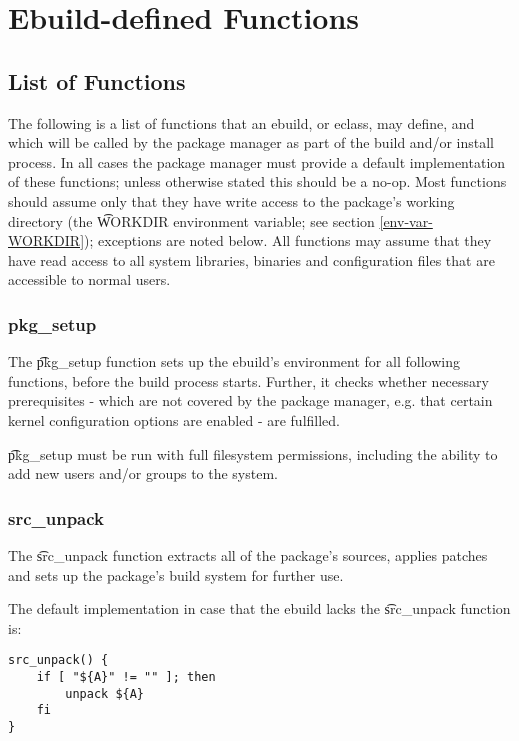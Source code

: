 \chapter{Ebuild-defined Functions}
\label{ebuild-functions}

\section{List of Functions}
\label{functions}

The following is a list of functions that an ebuild, or eclass, may define, and which will be called
by the package manager as part of the build and/or install process. In all cases the package manager
must provide a default implementation of these functions; unless otherwise stated this should be a
no-op. Most functions should assume only that they have write access to the package's working
directory (the \t{WORKDIR} environment variable; see section \ref{env-var-WORKDIR}); exceptions are
noted below. All functions may assume that they have read access to all system libraries, binaries
and configuration files that are accessible to normal users.

\subsection{pkg\_setup}
\label{pkg-setup-function}
The \t{pkg\_setup} function sets up the ebuild's environment for all following functions, before
the build process starts. Further, it checks whether necessary prerequisites - which are not covered
by the package manager, e.g. that certain kernel configuration options are enabled - are fulfilled.

\t{pkg\_setup} must be run with full filesystem permissions, including the ability to add new users
and/or groups to the system.

\subsection{src\_unpack}
\label{src-unpack-function}

The \t{src\_unpack} function extracts all of the package's sources, applies patches and sets up the
package's build system for further use.

The default implementation in case that the ebuild lacks the \t{src\_unpack} function is:

\begin{lstlisting}
src_unpack() {
    if [ "${A}" != "" ]; then
        unpack ${A}
    fi
}
\end{lstlisting}


